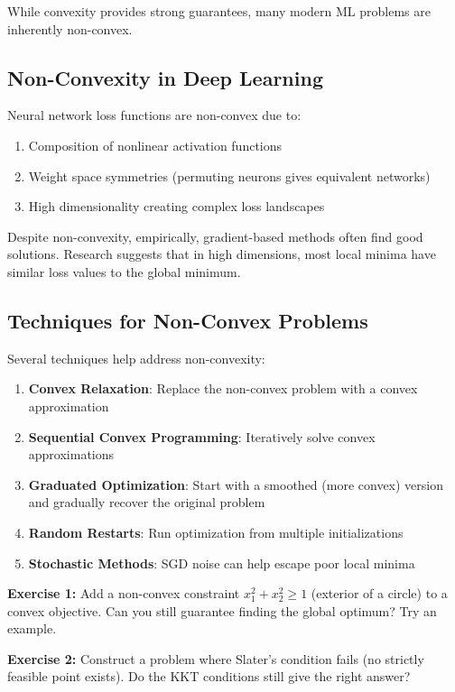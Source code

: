 \documentclass[../../main.tex]{subfiles}
\begin{document}
While convexity provides strong guarantees, many modern ML problems are inherently non-convex.

\subsection{Non-Convexity in Deep Learning}

\begin{important}
Neural network loss functions are non-convex due to:
\begin{enumerate}
    \item Composition of nonlinear activation functions
    \item Weight space symmetries (permuting neurons gives equivalent networks)
    \item High dimensionality creating complex loss landscapes
\end{enumerate}
Despite non-convexity, empirically, gradient-based methods often find good solutions. Research suggests that in high dimensions, most local minima have similar loss values to the global minimum.
\end{important}

\subsection{Techniques for Non-Convex Problems}

Several techniques help address non-convexity:

\begin{enumerate}
    \item \textbf{Convex Relaxation}: Replace the non-convex problem with a convex approximation

    \item \textbf{Sequential Convex Programming}: Iteratively solve convex approximations

    \item \textbf{Graduated Optimization}: Start with a smoothed (more convex) version and gradually recover the original problem

    \item \textbf{Random Restarts}: Run optimization from multiple initializations

    \item \textbf{Stochastic Methods}: SGD noise can help escape poor local minima
\end{enumerate}

\begin{whatbreaks}
\textbf{Exercise 1:} Add a non-convex constraint $x_1^2 + x_2^2 \geq 1$ (exterior of a circle) to a convex objective. Can you still guarantee finding the global optimum? Try an example.

\textbf{Exercise 2:} Construct a problem where Slater's condition fails (no strictly feasible point exists). Do the KKT conditions still give the right answer?
\end{whatbreaks}
\end{document}
